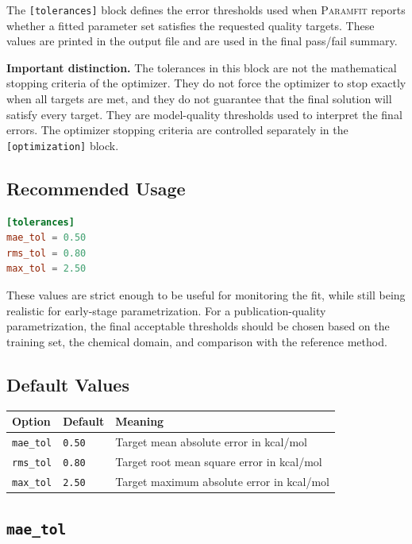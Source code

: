 \documentclass[11pt]{article}
\begin{document}
The \texttt{[tolerances]} block defines the error thresholds used when
\textsc{Paramfit} reports whether a fitted parameter set satisfies the requested
quality targets. These values are printed in the output file and are used in the
final pass/fail summary.

\textbf{Important distinction.}
The tolerances in this block are not the mathematical stopping criteria of the
optimizer. They do not force the optimizer to stop exactly when all targets are
met, and they do not guarantee that the final solution will satisfy every target.
They are model-quality thresholds used to interpret the final errors. The
optimizer stopping criteria are controlled separately in the \texttt{[optimization]}
block.

\subsection{Recommended Usage}

\begin{lstlisting}[language=toml]
[tolerances]
mae_tol = 0.50
rms_tol = 0.80
max_tol = 2.50
\end{lstlisting}

These values are strict enough to be useful for monitoring the fit, while still
being realistic for early-stage parametrization. For a publication-quality
parametrization, the final acceptable thresholds should be chosen based on the
training set, the chemical domain, and comparison with the reference method.

\subsection{Default Values}

\begin{center}
\begin{tabular}{lll}
\toprule
Option & Default & Meaning \\
\midrule
\texttt{mae\_tol} & \texttt{0.50} & Target mean absolute error in kcal/mol \\
\texttt{rms\_tol} & \texttt{0.80} & Target root mean square error in kcal/mol \\
\texttt{max\_tol} & \texttt{2.50} & Target maximum absolute error in kcal/mol \\
\bottomrule
\end{tabular}
\end{center}

\subsection{\texttt{mae\_tol}}
\end{document}
